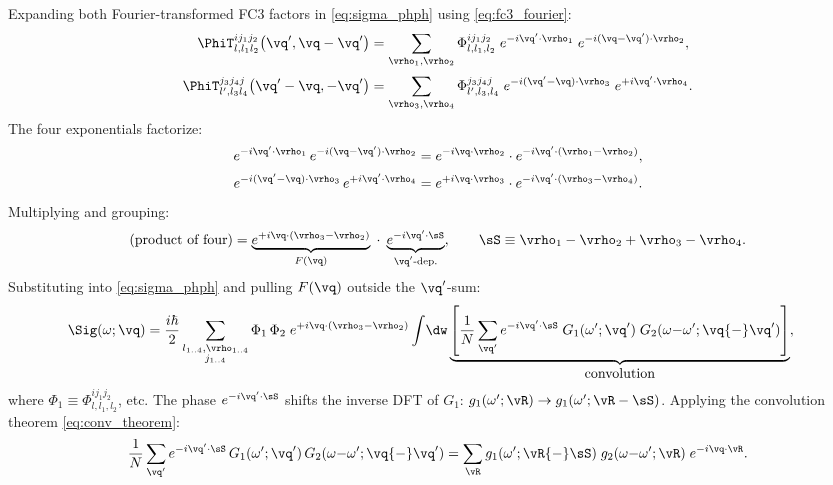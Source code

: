 Expanding both Fourier-transformed FC3 factors in
\cref{eq:sigma_phph} using \cref{eq:fc3_fourier}:
\begin{align}
  \PhiT^{ij_1j_2}_{l,l_1l_2}\!\left(\vq',\vq-\vq'\right)
  &= \sum_{\vrho_1,\vrho_2}
     \Phi^{ij_1j_2}_{l,l_1,l_2}\;
     e^{-i\vq'\cdot\vrho_1}\;
     e^{-i(\vq-\vq')\cdot\vrho_2},
  \label{eq:v1_expand}\\[2pt]
  \PhiT^{j_3j_4j}_{l',l_3l_4}\!\left(\vq'-\vq,-\vq'\right)
  &= \sum_{\vrho_3,\vrho_4}
     \Phi^{j_3j_4j}_{l',l_3,l_4}\;
     e^{-i(\vq'-\vq)\cdot\vrho_3}\;
     e^{+i\vq'\cdot\vrho_4}.
  \label{eq:v2_expand}
\end{align}
The four exponentials factorize:
\begin{align}
  e^{-i\vq'\cdot\vrho_1}\, e^{-i(\vq-\vq')\cdot\vrho_2}
  &= e^{-i\vq\cdot\vrho_2}\cdot
     e^{-i\vq'\cdot(\vrho_1-\vrho_2)},
  \label{eq:v1_phases}\\[2pt]
  e^{-i(\vq'-\vq)\cdot\vrho_3}\, e^{+i\vq'\cdot\vrho_4}
  &= e^{+i\vq\cdot\vrho_3}\cdot
     e^{-i\vq'\cdot(\vrho_3-\vrho_4)}.
  \label{eq:v2_phases}
\end{align}
Multiplying and grouping:
\begin{equation}
  \text{(product of four)}
  = \underbrace{e^{+i\vq\cdot(\vrho_3-\vrho_2)}}_{F(\vq)}
    \;\cdot\;
    \underbrace{e^{-i\vq'\cdot\sS}}_{\text{$\vq'$-dep.}},
  \qquad
  \sS \equiv \vrho_1 - \vrho_2 + \vrho_3 - \vrho_4.
  \label{eq:phases_combined}
\end{equation}
Substituting into \cref{eq:sigma_phph} and pulling $F(\vq)$
outside the $\vq'$-sum:
\begin{align}
  \Sig(\omega;\vq)
  &= \frac{i\hbar}{2}
    \sum_{\substack{l_{1..4},\vrho_{1..4}\\j_{1..4}}}
    \Phi_1\,\Phi_2\;
    e^{+i\vq\cdot(\vrho_3-\vrho_2)}
    \int\!\dw
    \underbrace{\left[
      \frac{1}{N}\sum_{\vq'} e^{-i\vq'\cdot\sS}\;
      G_1(\omega';\vq')\;G_2(\omega{-}\omega';\vq{-}\vq')
    \right]}_{\displaystyle\text{convolution}},
  \label{eq:sigma_intermediate}
\end{align}
where $\Phi_1 \equiv \Phi^{ij_1j_2}_{l,l_1,l_2}$, etc.
The phase $e^{-i\vq'\cdot\sS}$ shifts the inverse DFT of $G_1$:
$g_1(\omega';\vR) \to g_1(\omega';\vR - \sS)$.
Applying the convolution theorem \cref{eq:conv_theorem}:
\begin{equation}
  \frac{1}{N}\sum_{\vq'} e^{-i\vq'\cdot\sS}\,
  G_1(\omega';\vq')\,G_2(\omega{-}\omega';\vq{-}\vq')
  = \sum_{\vR} g_1(\omega';\vR{-}\sS)\;
    g_2(\omega{-}\omega';\vR)\;e^{-i\vq\cdot\vR}.
  \label{eq:conv_result}
\end{equation}
